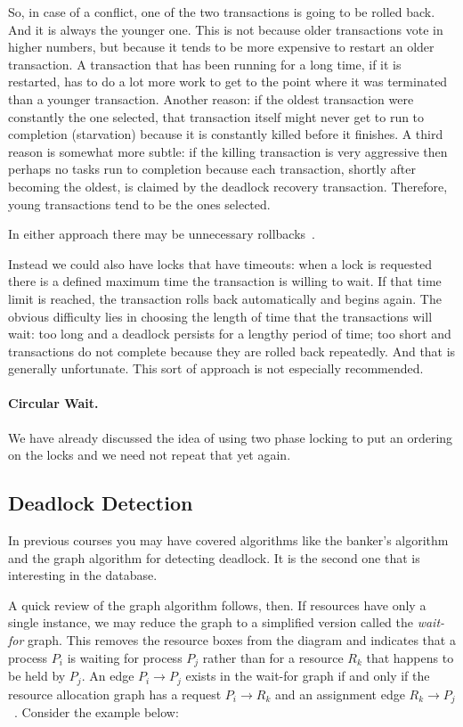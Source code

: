 So, in case of a conflict, one of the two transactions is going to be rolled back. And it is always the younger one. This is not because older transactions vote in higher numbers, but because it tends to be more expensive to restart an older transaction. A transaction that has been running for a long time, if it is restarted, has to do a lot more work to get to the point where it was terminated than a younger transaction. Another reason: if the oldest transaction were constantly the one selected, that transaction itself might never get to run to completion (starvation) because it is constantly killed before it finishes. A third reason is somewhat more subtle: if the killing transaction is very aggressive then perhaps no tasks run to completion because each transaction, shortly after becoming the oldest, is claimed by the deadlock recovery transaction. Therefore, young transactions tend to be the ones selected.

In either approach there may be unnecessary rollbacks~\cite{dsc}.

Instead we could also have locks that have timeouts: when a lock is requested there is a defined maximum time the transaction is willing to wait. If that time limit is reached, the transaction rolls back automatically and begins again. The obvious difficulty lies in choosing the length of time that the transactions will wait: too long and a deadlock persists for a lengthy period of time; too short and transactions do not complete because they are rolled back repeatedly. And that is generally unfortunate. This sort of approach is not especially recommended. 

\paragraph{Circular Wait.}
We have already discussed the idea of using two phase locking to put an ordering on the locks and we need not repeat that yet again. 

\subsection*{Deadlock Detection}

In previous courses you may have covered algorithms like the banker's algorithm and the graph algorithm for detecting deadlock. It is the second one that is interesting in the database.

A quick review of the graph algorithm follows, then. If resources have only a single instance, we may reduce the graph to a simplified version called the \textit{wait-for} graph. This removes the resource boxes from the diagram and indicates that a process $P_{i}$ is waiting for process $P_{j}$ rather than for a resource $R_{k}$ that happens to be held by $P_{j}$. An edge $P_{i} \rightarrow P_{j}$ exists in the wait-for graph if and only if the resource allocation graph has a request $P_{i} \rightarrow R_{k}$ and an assignment edge $R_{k} \rightarrow P_{j}$~\cite{osc}. Consider the example below:

